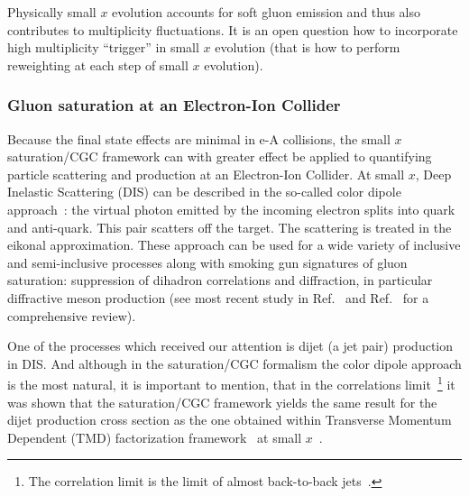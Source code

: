 Physically small $x$ evolution accounts for soft gluon emission and thus 
also contributes to multiplicity fluctuations. It is an open question how to 
incorporate high multiplicity ``trigger'' in small $x$ evolution (that is how to perform 
reweighting at each step of small $x$ evolution). 

%
%
%
%
%



\subsubsection*{Gluon saturation at an Electron-Ion Collider} 
Because the final state effects are  minimal in e-A collisions, 
the small $x$ saturation/CGC framework can with greater effect be applied to 
quantifying particle scattering and production at an Electron-Ion Collider. 
At small $x$, Deep Inelastic Scattering (DIS) can be described in the so-called color 
dipole approach~\cite{Gunion:1976iy,Nussinov:1975mw,Nussinov:1975qb,Marquet:2009ca}: 
the virtual photon emitted by the incoming electron splits into quark and anti-quark.
This pair scatters off the target. The scattering is treated in the eikonal approximation.
These approach can be used for a wide variety of inclusive and semi-inclusive processes  
along with  smoking gun signatures of gluon saturation: suppression of dihadron 
correlations 
 and diffraction, in particular diffractive meson production 
(see most recent study in Ref.~\cite{Mantysaari:2017slo}
and Ref.~\cite{Aschenauer:2017jsk} 
for a comprehensive review). 



One of the processes which received our attention  is dijet (a jet pair) production in DIS.
And although in the saturation/CGC formalism the color dipole approach is the most natural, 
it is important to mention, that in the correlations limit~\footnote{The correlation limit is  
the limit of almost back-to-back jets~\cite{Dominguez:2011wm,Dominguez:2011br}.}
it was shown that the saturation/CGC framework yields the same result for the dijet production
cross section as the one obtained within Transverse Momentum Dependent (TMD) factorization 
framework~\cite{Mulders:2000sh,Bomhof:2006dp,Meissner:2007rx} at small $x$~\cite{Metz:2011wb,Dominguez:2011wm}. 



